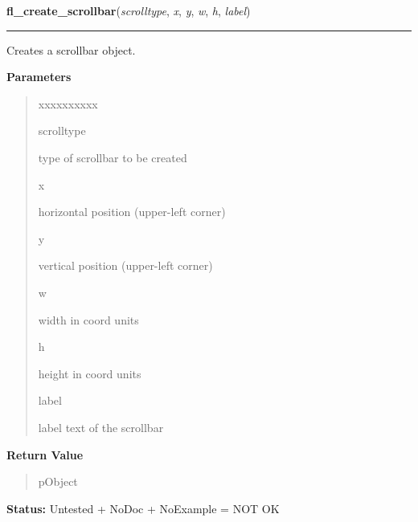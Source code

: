     \label{xformslib:library:fl_create_scrollbar}

    \vspace{0.5ex}

\hspace{.8\funcindent}\begin{boxedminipage}{\funcwidth}

    \raggedright \textbf{fl\_create\_scrollbar}(\textit{scrolltype}, \textit{x}, \textit{y}, \textit{w}, \textit{h}, \textit{label})

    \vspace{-1.5ex}

    \rule{\textwidth}{0.5\fboxrule}
\setlength{\parskip}{2ex}
    Creates a scrollbar object.

\setlength{\parskip}{1ex}
      \textbf{Parameters}
      \vspace{-1ex}

      \begin{quote}
        \begin{Ventry}{xxxxxxxxxx}

          \item[scrolltype]

          type of scrollbar to be created

          \item[x]

          horizontal position (upper-left corner)

          \item[y]

          vertical position (upper-left corner)

          \item[w]

          width in coord units

          \item[h]

          height in coord units

          \item[label]

          label text of the scrollbar

        \end{Ventry}

      \end{quote}

      \textbf{Return Value}
    \vspace{-1ex}

      \begin{quote}
      pObject

      \end{quote}

\textbf{Status:} Untested + NoDoc + NoExample = NOT OK



    \end{boxedminipage}

